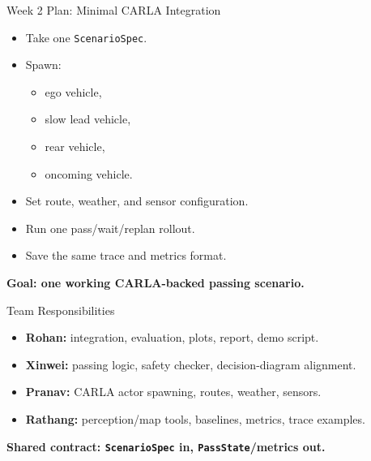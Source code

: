 \documentclass[aspectratio=169,11pt]{beamer}
\begin{document}
\begin{frame}{Week 2 Plan: Minimal CARLA Integration}
\begin{itemize}
\item Take one \texttt{ScenarioSpec}.
\item Spawn:
\begin{itemize}
\item ego vehicle,
\item slow lead vehicle,
\item rear vehicle,
\item oncoming vehicle.
\end{itemize}

\pause

\item Set route, weather, and sensor configuration.
\item Run one pass/wait/replan rollout.
\item Save the same trace and metrics format.
\end{itemize}

\vspace{8pt}
\begin{center}
\textbf{Goal: one working CARLA-backed passing scenario.}
\end{center}
\end{frame}

\begin{frame}{Team Responsibilities}
\begin{itemize}
\item \textbf{Rohan:} integration, evaluation, plots, report, demo script.
\item \textbf{Xinwei:} passing logic, safety checker, decision-diagram alignment.
\item \textbf{Pranav:} CARLA actor spawning, routes, weather, sensors.
\item \textbf{Rathang:} perception/map tools, baselines, metrics, trace examples.
\end{itemize}

\vspace{10pt}
\begin{center}
\textbf{Shared contract: \texttt{ScenarioSpec} in, \texttt{PassState}/metrics out.}
\end{center}
\end{frame}
\end{document}
